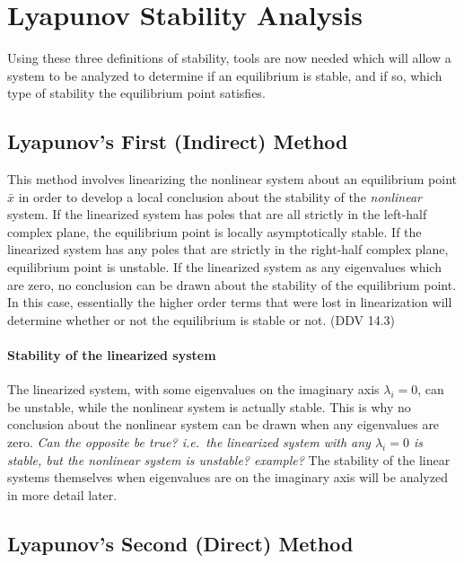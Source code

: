 \section{Lyapunov Stability Analysis}

Using these three definitions of stability, tools are now needed which will allow a system to be analyzed to determine if an equilibrium is stable, and if so, which type of stability the equilibrium point satisfies.

\subsection{Lyapunov's First (Indirect) Method}

This method involves linearizing the nonlinear system about an equilibrium point $\bar{x}$ in order to develop a local conclusion about the stability of the \textit{nonlinear} system.
If the linearized system has poles that are all strictly in the left-half complex plane, the equilibrium point is locally asymptotically stable.
If the linearized system has any poles that are strictly in the right-half complex plane, equilibrium point is unstable.
If the linearized system as any eigenvalues which are zero, no conclusion can be drawn about the stability of the equilibrium point.
In this case, essentially the higher order terms that were lost in linearization will determine whether or not the equilibrium is stable or not.
(DDV 14.3)

\paragraph{Stability of the linearized system}
The linearized system, with some eigenvalues on the imaginary axis $\lambda_{i}=0$, can be unstable, while the nonlinear system is actually stable.
This is why no conclusion about the nonlinear system can be drawn when any eigenvalues are zero.
\textit{Can the opposite be true? i.e.\ the linearized system with any $\lambda_{i}=0$ is stable, but the nonlinear system is unstable? example?} The stability of the linear systems themselves when eigenvalues are on the imaginary axis will be analyzed in more detail later.

\subsection{Lyapunov's Second (Direct) Method}

